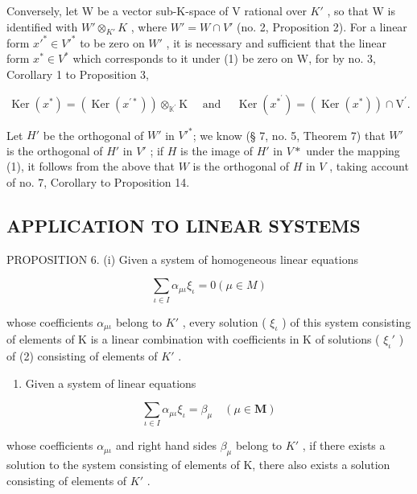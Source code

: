 Conversely, let W be a vector sub-K-space of V rational over \(K'\) , so that W is identified with \(W' \otimes_{K'} K\) , where \(W' = W \cap V'\) (no. 2, Proposition 2). For a linear form \(x'^* \in V'^*\) to be zero on \(W'\) , it is necessary and sufficient that the linear form \(x^* \in V^*\) which corresponds to it under (1) be zero on W, for by no. 3, Corollary 1 to Proposition 3,

\[
\operatorname{Ker} (x ^ {*}) = \left(\operatorname{Ker} (x ^ {\prime *})\right) \otimes_ {\mathbb {K} ^ {\prime}} \mathrm{K} \quad \text { and } \quad \operatorname{Ker} (x ^ {* ^ {\prime}}) = (\operatorname{Ker} (x ^ {*})) \cap \mathrm{V} ^ {\prime}.
\]

Let \(H'\) be the orthogonal of \(W'\) in \(V'^*\); we know (§ 7, no. 5, Theorem 7) that \(W'\) is the orthogonal of \(H'\) in \(V'\) ; if \(H\) is the image of \(H'\) in \(V*\) under the mapping (1), it follows from the above that \(W\) is the orthogonal of \(H\) in \(V\) , taking account of no. 7, Corollary to Proposition 14.

\subsection{APPLICATION TO LINEAR SYSTEMS}

PROPOSITION 6. (i) Given a system of homogeneous linear equations

\[
\sum_ {\iota \in I} \alpha_ {\mu \iota} \xi_ {\iota} = 0 (\mu \in M)\tag{2}
\]

whose coefficients \(\alpha_{\mu \iota}\) belong to \(K'\) , every solution ( \(\xi_{\iota}\) ) of this system consisting of elements of K is a linear combination with coefficients in K of solutions ( \(\xi_{\iota}'\) ) of (2) consisting of elements of \(K'\) .

\begin{enumerate}
\def\labelenumi{(\roman{enumi})}
\setcounter{enumi}{1}
\tightlist
\item
  Given a system of linear equations
\end{enumerate}

\[
\sum_ {\iota \in I} \alpha_ {\mu \iota} \xi_ {\iota} = \beta_ {\mu} \quad (\mu \in \mathbf {M})\tag{3}
\]

whose coefficients \(\alpha_{\mu \iota}\) and right hand sides \(\beta_{\mu}\) belong to \(K'\) , if there exists a solution to the system consisting of elements of K, there also exists a solution consisting of elements of \(K'\) .


